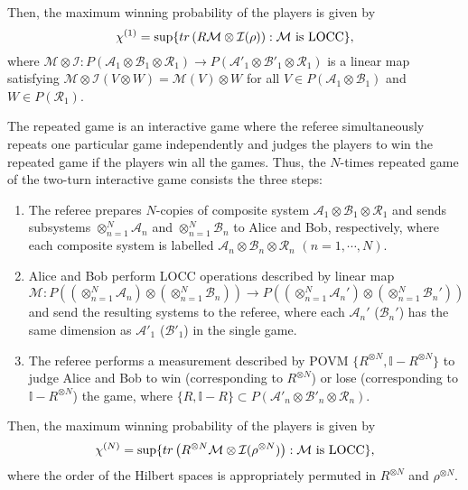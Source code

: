 \documentclass[aps,prx,twocolumn,showpacs,amsmath,notitlepage,amssymb,superscriptaddress]{revtex4-1}
\begin{document}
Then, the maximum winning probability of the players is given by
\begin{equation}
 \chi^{(1)}=\sup\{tr\left(R\mathcal{M}\otimes\mathcal{I}(\rho)\right):\mathcal{M}{\rm\ is\ LOCC}\},
\end{equation}
where $\mathcal{M}\otimes\mathcal{I}:P(\mathcal{A}_1\otimes\mathcal{B}_1\otimes\mathcal{R}_1)\rightarrow P(\mathcal{A}'_1\otimes\mathcal{B}'_1\otimes\mathcal{R}_1)$ is a linear map satisfying $\mathcal{M}\otimes\mathcal{I}(V\otimes W)=\mathcal{M}(V)\otimes W$ for all $V\in P(\mathcal{A}_1\otimes\mathcal{B}_1)$ and $W\in P(\mathcal{R}_1)$. 

The repeated game is an interactive game where the referee simultaneously repeats one particular game independently and judges the players to win the repeated game if the players win all the games.
Thus, the $N$-times repeated game of the two-turn interactive game consists the three steps:
\begin{enumerate}
 \item The referee prepares $N$-copies of composite system $\mathcal{A}_1\otimes\mathcal{B}_1\otimes\mathcal{R}_1$ and sends subsystems $\otimes_{n=1}^N\mathcal{A}_n$ and $\otimes_{n=1}^N\mathcal{B}_n$ to Alice and Bob, respectively, where each composite system is labelled $\mathcal{A}_n\otimes\mathcal{B}_n\otimes\mathcal{R}_n$ $(n=1,\cdots,N)$.
 
 \item Alice and Bob perform LOCC operations described by linear map $\mathcal{M}:P((\otimes_{n=1}^N\mathcal{A}_n)\otimes(\otimes_{n=1}^N\mathcal{B}_n))\rightarrow P((\otimes_{n=1}^N\mathcal{A}_n')\otimes(\otimes_{n=1}^N\mathcal{B}_n'))$ and send the resulting systems to the referee, where each $\mathcal{A}_n'$ ($\mathcal{B}_n'$) has the same dimension as $\mathcal{A}'_1$ ($\mathcal{B}'_1$) in the single game.
 
 \item The referee performs a measurement described by POVM $\{R^{\otimes N},\mathbb{I}-R^{\otimes N}\}$ to judge Alice and Bob to win (corresponding to $R^{\otimes N}$) or lose (corresponding to $\mathbb{I}-R^{\otimes N}$) the game, where $\{R,\mathbb{I}-R\}\subset P(\mathcal{A}'_n\otimes\mathcal{B}'_n\otimes\mathcal{R}_n)$.
\end{enumerate}
Then, the maximum winning probability of the players is given by
\begin{equation}
  \chi^{(N)}=\sup\{tr\left(R^{\otimes N}\mathcal{M}\otimes\mathcal{I}(\rho^{\otimes N})\right):\mathcal{M}{\rm\ is\ LOCC}\},
\end{equation} 
where the order of the Hilbert spaces is appropriately permuted in $R^{\otimes N}$ and $\rho^{\otimes N}$.
\end{document}
